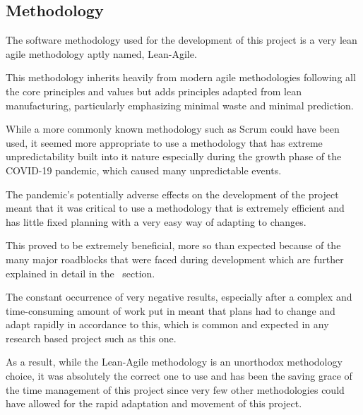 \documentclass[12pt]{article}
\newcommand{\sentence}{} %
\begin{document}

    \subsection{Methodology}\label{subsec:methodology}


    \tab
    The software methodology used for the development of this project is a very lean agile methodology aptly named,
    Lean-Agile.
    \sentence
    This methodology inherits heavily from modern agile methodologies following all the core principles and values
    but adds principles adapted from lean manufacturing, particularly emphasizing minimal waste and minimal
    prediction.
    \sentence
    While a more commonly known methodology such as Scrum could have been used, it seemed more appropriate to use a
    methodology that has extreme unpredictability built into it nature especially during the growth phase of the
    COVID-19 pandemic, which caused many unpredictable events.
    \sentence
    The pandemic's potentially adverse effects on the development of the project meant that it was critical to use a
    methodology that is extremely efficient and has little fixed planning with a very easy way of adapting to changes.
    \sentence
    This proved to be extremely beneficial, more so than expected because of the many major roadblocks that were
    faced during development which are further explained in detail in the~ section.
    \sentence
    The constant occurrence of very negative results, especially after a complex and time-consuming amount of work
    put in meant that plans had to change and adapt rapidly in accordance to this, which is common and expected in
    any research based project such as this one.
    \sentence
    As a result, while the Lean-Agile methodology is an unorthodox methodology choice, it was absolutely the correct
    one to use and has been the saving grace of the time management of this project since very few other
    methodologies could have allowed for the rapid adaptation and movement of this project.
\end{document}
